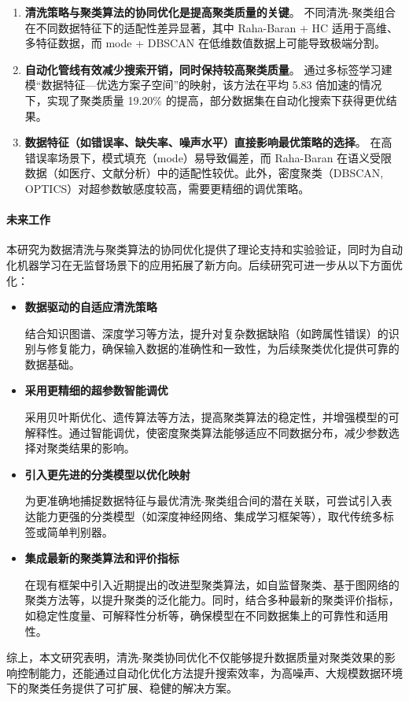\documentclass[10pt]{article} %
\numberwithin{equation}{section}
\begin{document}
\begin{enumerate}
    \item \textbf{清洗策略与聚类算法的协同优化是提高聚类质量的关键}。  
    不同清洗-聚类组合在不同数据特征下的适配性差异显著，其中 Raha-Baran + HC 适用于高维、多特征数据，而 mode + DBSCAN 在低维数值数据上可能导致极端分割。

    \item \textbf{自动化管线有效减少搜索开销，同时保持较高聚类质量}。  
    通过多标签学习建模“数据特征—优选方案子空间”的映射，该方法在平均 5.83 倍加速的情况下，实现了聚类质量 19.20\% 的提高，部分数据集在自动化搜索下获得更优结果。

    \item \textbf{数据特征（如错误率、缺失率、噪声水平）直接影响最优策略的选择}。  
    在高错误率场景下，模式填充（mode）易导致偏差，而 Raha-Baran 在语义受限数据（如医疗、文献分析）中的适配性较优。此外，密度聚类（DBSCAN, OPTICS）对超参数敏感度较高，需要更精细的调优策略。
\end{enumerate}

\paragraph{未来工作}  
本研究为数据清洗与聚类算法的协同优化提供了理论支持和实验验证，同时为自动化机器学习在无监督场景下的应用拓展了新方向。后续研究可进一步从以下方面优化：

\begin{itemize}
    \item \textbf{数据驱动的自适应清洗策略} 
 
    结合知识图谱、深度学习等方法，提升对复杂数据缺陷（如跨属性错误）的识别与修复能力，确保输入数据的准确性和一致性，为后续聚类优化提供可靠的数据基础。

    \item \textbf{采用更精细的超参数智能调优}  

    采用贝叶斯优化、遗传算法等方法，提高聚类算法的稳定性，并增强模型的可解释性。通过智能调优，使密度聚类算法能够适应不同数据分布，减少参数选择对聚类结果的影响。

    \item \textbf{引入更先进的分类模型以优化映射}  

    为更准确地捕捉数据特征与最优清洗-聚类组合间的潜在关联，可尝试引入表达能力更强的分类模型（如深度神经网络、集成学习框架等），取代传统多标签或简单判别器。

    \item \textbf{集成最新的聚类算法和评价指标}  

    在现有框架中引入近期提出的改进型聚类算法，如自监督聚类、基于图网络的聚类方法等，以提升聚类的泛化能力。同时，结合多种最新的聚类评价指标，如稳定性度量、可解释性分析等，确保模型在不同数据集上的可靠性和适用性。
\end{itemize}

综上，本文研究表明，清洗-聚类协同优化不仅能够提升数据质量对聚类效果的影响控制能力，还能通过自动化优化方法提升搜索效率，为高噪声、大规模数据环境下的聚类任务提供了可扩展、稳健的解决方案。

\begingroup
\small %

    
\endgroup
\end{document}
